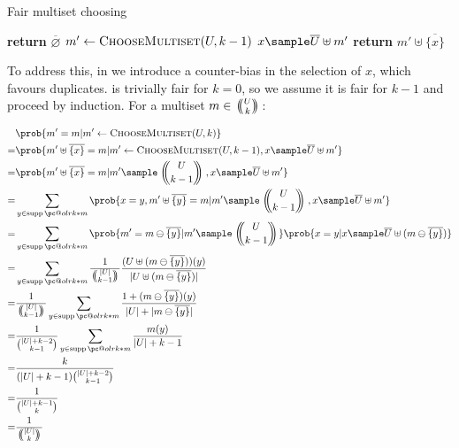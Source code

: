 \documentclass[letterpaper,luatex,11pt]{article}
\makeatletter
\renewcommand{\supportname}{supp}
\renewcommand{\supp}[1]{\ensuremath{\operatorname{\supportname}\pc@olrk*{#1}}}
\newcommand{\multichoose}[2]{
\left.\mathchoice
  {\left(\kern-0.48em\binom{#1}{#2}\kern-0.48em\right)}
  {\big(\kern-0.30em\binom{\smash{#1}}{\smash{#2}}\kern-0.30em\big)}
  {\left(\kern-0.30em\binom{\smash{#1}}{\smash{#2}}\kern-0.30em\right)}
  {\left(\kern-0.30em\binom{\smash{#1}}{\smash{#2}}\kern-0.30em\right)}
\right.}
\makeatother
\begin{document}


\begin{algorithm}
\caption{Fair multiset choosing}\label{ChooseMultiset}
\begin{algorithmic}[0]
        \State \textbf{return} $\overline{\varnothing}$
    \Else
        \State $m' \leftarrow \textproc{ChooseMultiset}(U, k-1)$
        \State $x \sample \overline{U} \uplus m'$
        \State \textbf{return} $m' \uplus \overline{\{x\}}$
    \EndIf
\EndProcedure
\end{algorithmic}
\end{algorithm}

To address this, in  we introduce a
counter-bias in the selection of $x$, which favours duplicates.
 is trivially fair for $k = 0$, so we assume
it is fair for $k - 1$ and proceed by induction. For a multiset $m \in
\multichoose{U}{k}$:

\begin{align*}
    &\prob{m' = m | m' \leftarrow \textproc{ChooseMultiset}(U, k)}
    \\
    =&
    \prob{m' \uplus \overline{\{x\}} = m
        | m' \leftarrow \textproc{ChooseMultiset}(U, k-1), x \sample \overline{U} \uplus m'}
    \\
    =&
    \prob{m' \uplus \overline{\{x\}} = m
        | m' \sample \multichoose{U}{k - 1}, x \sample \overline{U} \uplus m'}
    \\
    =&
    \sum_{y \in \supp{m}}
    \prob{x = y, m' \uplus \overline{\{y\}} = m
        | m' \sample \multichoose{U}{k - 1}, x \sample \overline{U} \uplus m'}
    \\
    =&
    \sum_{y \in \supp{m}}
    \prob{m' = m \ominus \overline{\{y\}} | m' \sample \multichoose{U}{k - 1}}
    \prob{x = y | x \sample \overline{U} \uplus (m \ominus \overline{\{y\}})}
    \\
    =&
    \sum_{y \in \supp{m}}
    \frac{1}{\multichoose{|U|}{k - 1}}
    \frac{(U \uplus (m \ominus \overline{\{y\}}))(y)}{|U \uplus (m \ominus \overline{\{y\}})|}
    \\
    =&
    \frac{1}{\multichoose{|U|}{k - 1}}
    \sum_{y \in \supp{m}}
    \frac{1 + (m \ominus \overline{\{y\}})(y)}{|U| + |m \ominus \overline{\{y\}}|}
    \\
    =&
    \frac{1}{\binom{|U| + k - 2}{k-1}}
    \sum_{y \in \supp{m}}
    \frac{m(y)}{|U| + k -1}
    \\
    =& \frac{k}{(|U| + k -1)\binom{|U| + k - 2}{k-1}}
    \\
    =& \frac{1}{\binom{|U| + k - 1}{k}}
    \\
    =& \frac{1}{\multichoose{|U|}{k}}
\end{align*}
\end{document}
